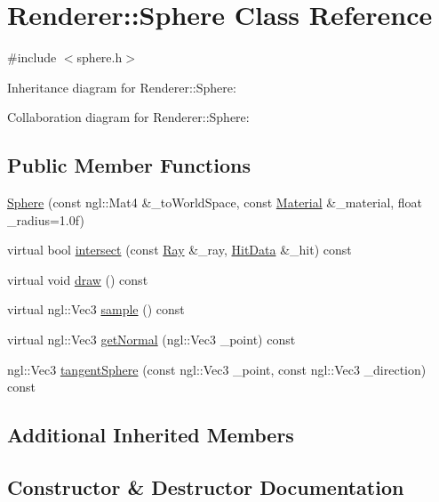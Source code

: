 \hypertarget{classRenderer_1_1Sphere}{}\section{Renderer\+:\+:Sphere Class Reference}
\label{classRenderer_1_1Sphere}


{\ttfamily \#include $<$sphere.\+h$>$}



Inheritance diagram for Renderer\+:\+:Sphere\+:


Collaboration diagram for Renderer\+:\+:Sphere\+:
\subsection*{Public Member Functions}
\begin{DoxyCompactItemize}
\item 
\hyperlink{classRenderer_1_1Sphere_a1cc7e679282a27fba0d528021061f571}{Sphere} (const ngl\+::\+Mat4 \&\+\_\+to\+World\+Space, const \hyperlink{structMaterial}{Material} \&\+\_\+material, float \+\_\+radius=1.\+0f)
\item 
virtual bool \hyperlink{classRenderer_1_1Sphere_ac9525a1fa2081d065e25e93f5e2f4b1d}{intersect} (const \hyperlink{structRenderer_1_1Ray}{Ray} \&\+\_\+ray, \hyperlink{structRenderer_1_1HitData}{Hit\+Data} \&\+\_\+hit) const 
\item 
virtual void \hyperlink{classRenderer_1_1Sphere_addc6c6ef784badc0065ef827d1edda7f}{draw} () const 
\item 
virtual ngl\+::\+Vec3 \hyperlink{classRenderer_1_1Sphere_a63986b9167dd275192e87cc3c578d91a}{sample} () const 
\item 
virtual ngl\+::\+Vec3 \hyperlink{classRenderer_1_1Sphere_a9a25c8561b372c717b03ab1696473b73}{get\+Normal} (ngl\+::\+Vec3 \+\_\+point) const 
\item 
ngl\+::\+Vec3 \hyperlink{classRenderer_1_1Sphere_a1e60080d349a95c18e29bd3e2f0f3819}{tangent\+Sphere} (const ngl\+::\+Vec3 \+\_\+point, const ngl\+::\+Vec3 \+\_\+direction) const 
\end{DoxyCompactItemize}
\subsection*{Additional Inherited Members}


\subsection{Constructor \& Destructor Documentation}
\hypertarget{classRenderer_1_1Sphere_a1cc7e679282a27fba0d528021061f571}{}
